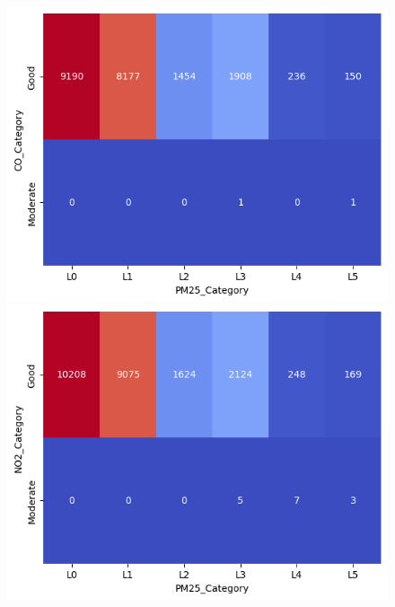\documentclass{article}
\begin{document}
\begin{figure}[htb]
    \centering
    \includegraphics[scale=0.5]{air_pollution/analysis/correlation/co-pm25.png}
    \includegraphics[scale=0.5]{air_pollution/analysis/correlation/no2-pm25.png}

\end{figure}
\end{document}
